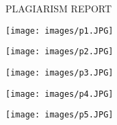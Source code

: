 \thispagestyle{plain}
\begin{center}
\large \large {PLAGIARISM REPORT}

\end{center}

\begin{center}
   \texttt{[image: images/p1.JPG]} 
\end{center}


\begin{center}
   \texttt{[image: images/p2.JPG]} 
\end{center}


\begin{center}
   \texttt{[image: images/p3.JPG]} 
\end{center}


\begin{center}
   \texttt{[image: images/p4.JPG]} 
\end{center}


\begin{center}
   \texttt{[image: images/p5.JPG]} 
\end{center}

\newpage